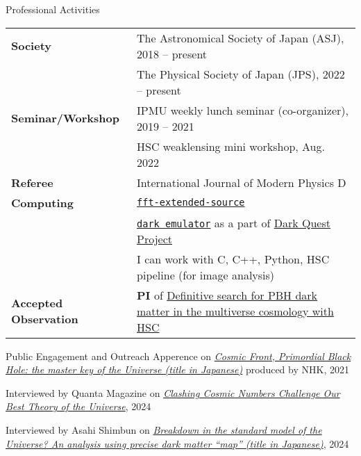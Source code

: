 \begin{rSection}{Professional Activities}
    \begin{tabular}{ @{} >{\bfseries}l @{\hspace{6ex}} p{}}
    Society              & The Astronomical Society of Japan (ASJ), 2018 -- present \\
                         & The Physical Society of Japan (JPS), 2022 -- present  \\
    Seminar/Workshop     & IPMU weekly lunch seminar (co-organizer), 2019 -- 2021 \\
                         & HSC weaklensing mini workshop, Aug. 2022  \\
    Referee              & International Journal of Modern Physics D \\
    Computing            & \href{https://github.com/git-sunao/fft-extended-source}{\tt fft-extended-source} \\
                         & \href{https://dark-emulator.readthedocs.io/en/latest/}{\tt dark emulator} as a part of \href{https://darkquestcosmology.github.io}{Dark Quest Project} \\
                         & I can work with C, C++, Python, HSC pipeline (for image analysis) \\
    Accepted Observation & {\textbf{PI}} of \href{https://subarutelescope.org/Observing/Schedule/S20B_abstract/S20B0032abst.html}{Definitive search for PBH dark matter in the multiverse cosmology with HSC}
    \end{tabular}
\end{rSection}

\begin{rSection}{Public Engagement and Outreach}
  Apperence on \href{https://www.nhk-ondemand.jp/goods/G2021114366SA000/}{\textit{Cosmic Front, Primordial Black Hole: the master key of the Universe (title in Japanese)}} produced by NHK, 2021

  Interviewed by Quanta Magazine on \href{https://www.quantamagazine.org/clashing-cosmic-numbers-challenge-our-best-theory-of-the-universe-20240119/}{\textit{Clashing Cosmic Numbers Challenge Our Best Theory of the Universe}}, 2024
  
  Interviewed by Asahi Shimbun on \href{https://www.asahi.com/articles/ASR4H415RR48ULBH001.html}{\textit{Breakdown in the standard model of the Universe? An analysis using precise dark matter ``map'' (title in Japanese)}}, 2024
\end{rSection}